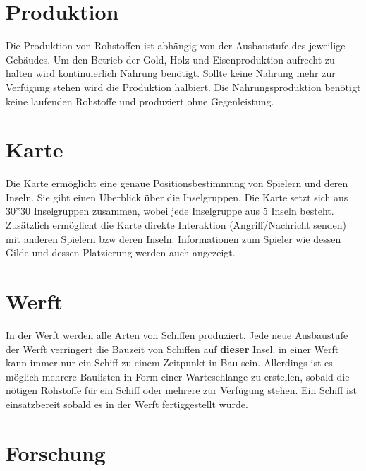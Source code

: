 \documentclass[10pt,a4paper]{article}
\begin{document}
\section{Produktion}

Die Produktion von Rohstoffen ist abhängig von der Ausbaustufe des jeweilige Gebäudes. Um den Betrieb der Gold, Holz und Eisenproduktion aufrecht zu halten wird kontinuierlich Nahrung benötigt. Sollte keine Nahrung mehr zur Verfügung stehen wird die Produktion halbiert. Die Nahrungsproduktion benötigt keine laufenden Rohstoffe und produziert ohne Gegenleistung.

\section{Karte}
Die Karte ermöglicht eine genaue Positionsbestimmung von Spielern und deren Inseln. Sie gibt einen Überblick über die Inselgruppen. Die Karte setzt sich aus 30*30 Inselgruppen zusammen, wobei jede Inselgruppe aus 5 Inseln besteht. Zusätzlich ermöglicht die Karte direkte Interaktion (Angriff/Nachricht senden) mit anderen Spielern bzw deren Inseln. Informationen zum Spieler wie dessen Gilde und dessen Platzierung werden auch angezeigt.

\section{Werft}

In der Werft werden alle Arten von Schiffen produziert. Jede neue Ausbaustufe der Werft verringert die Bauzeit von Schiffen auf \textbf{dieser} Insel. in einer Werft kann immer nur ein Schiff zu einem Zeitpunkt in Bau sein. Allerdings ist es möglich mehrere Baulisten in Form einer Warteschlange zu erstellen, sobald die nötigen Rohstoffe für ein Schiff oder mehrere zur Verfügung stehen. Ein Schiff ist einsatzbereit sobald es in der Werft fertiggestellt wurde.

\section{Forschung}
\end{document}
